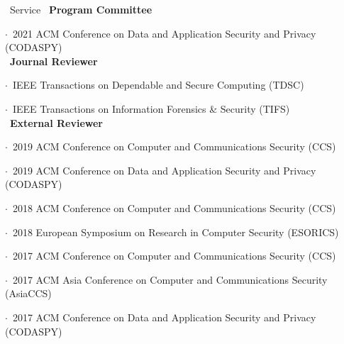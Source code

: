 \documentclass{resume} %
\begin{document}
\begin{rSection}{\faGenderless~Service}
    \textbullet~{\bf Program Committee} \\
        \strut\hspace{1cm}$\cdot$~2021 ACM Conference on Data and Application Security and Privacy (CODASPY)\\

    \textbullet~{\bf Journal Reviewer} \\
        \strut\hspace{1cm}$\cdot$~IEEE Transactions on Dependable and Secure Computing (TDSC)\\
        \strut\hspace{1cm}$\cdot$~IEEE Transactions on Information Forensics \& Security (TIFS)\\

	\textbullet~{\bf External Reviewer} \\
        \strut\hspace{1cm}$\cdot$~2019 ACM Conference on Computer and Communications Security (CCS)\\
        \strut\hspace{1cm}$\cdot$~2019 ACM Conference on Data and Application Security and Privacy (CODASPY)\\
		\strut\hspace{1cm}$\cdot$~2018 ACM Conference on Computer and Communications Security (CCS)\\
		\strut\hspace{1cm}$\cdot$~2018 European Symposium on Research in Computer Security (ESORICS)\\
		\strut\hspace{1cm}$\cdot$~2017 ACM Conference on Computer and Communications Security (CCS)\\
		\strut\hspace{1cm}$\cdot$~2017 ACM Asia Conference on Computer and Communications Security (AsiaCCS) \\
		\strut\hspace{1cm}$\cdot$~2017 ACM Conference on Data and Application Security and Privacy (CODASPY)

	\vspace{3mm}
\end{rSection}

\end{document}
